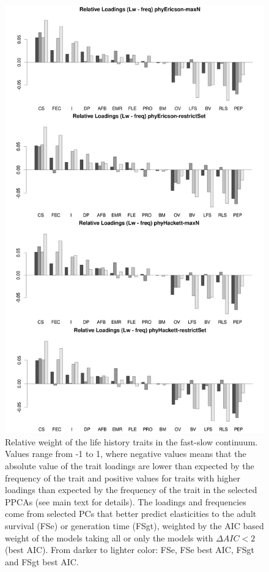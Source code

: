 \begin{figure}[ht!]
\centering
\includegraphics[width=.8\textwidth]{./Figures/Appendix2_1/FS relWeights plots-ALL.png}
\caption[LHT relative importance of the FS axes]{
Relative weight of the life history traits in the fast-slow continuum. Values
range from -1 to 1, where negative values means that the absolute value of the
trait loadings are lower than expected by the frequency of the trait and
positive values for traits with higher loadings than expected by the frequency
of the trait in the selected PPCAs (see main text for details). The loadings and
frequencies come from selected PCs that better predict elasticities to the
adult survival (FSe) or generation time (FSgt), weighted by the AIC based weight
of the models taking all or only the models with $\Delta AIC < 2$ (best AIC).
From darker to lighter color: FSe, FSe best AIC, FSgt and FSgt best AIC.}
\label{fig:figApp2.2}
\end{figure}

